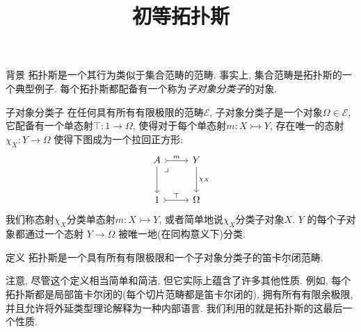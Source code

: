 \documentclass[aspectratio=169,xcolor=dvipsnames]{beamer}
\title{初等拓扑斯}
\date{}
\newcommand\calE{\mathcal{E}}
\begin{document}
\begin{frame}
    \titlepage
\end{frame}

\begin{frame}{背景}
拓扑斯是一个其行为类似于集合范畴的范畴. 事实上, 集合范畴是拓扑斯的一个典型例子. 每个拓扑斯都配备有一个称为\emph{子对象分类子}的对象.
\end{frame}

\begin{frame}{子对象分类子}
  在任何具有所有有限极限的范畴$\calE$, 子对象分类子是一个对象$\Omega\in\calE$, 它配备有一个单态射$\top : 1 \to \Omega$, 使得对于每个单态射$m:X\rightarrowtail Y$, 存在唯一的态射$\chi_{X} : Y\to\Omega$ 使得下图成为一个拉回正方形:\[
  \begin{tikzcd}[row sep=large]
  A \arrow[r,tail,"m"] \arrow[dr,phantom,"\lrcorner",very near start] \arrow[d] & Y \arrow[d,"\chi_{X}"] \\
  1 \arrow[r,tail,"\top"] & \Omega
  \end{tikzcd} \]
  我们称态射$\chi_{X}$分类单态射$m:X\rightarrowtail Y$, 或者简单地说$\chi_{X}$分类子对象$X$. $Y$ 的每个子对象都通过一个态射 $Y \to \Omega$ 被唯一地(在同构意义下)分类.
\end{frame}

\begin{frame}[shrink]{定义}
   拓扑斯是一个具有所有有限极限和一个子对象分类子的笛卡尔闭范畴.
   
\bigskip
   注意, 尽管这个定义相当简单和简洁, 但它实际上蕴含了许多其他性质. 例如, 每个拓扑斯都是局部笛卡尔闭的(每个切片范畴都是笛卡尔闭的), 拥有所有有限余极限, 并且允许将外延类型理论解释为一种内部语言. 我们利用的就是拓扑斯的这最后一个性质.
\end{frame}
\end{document}
